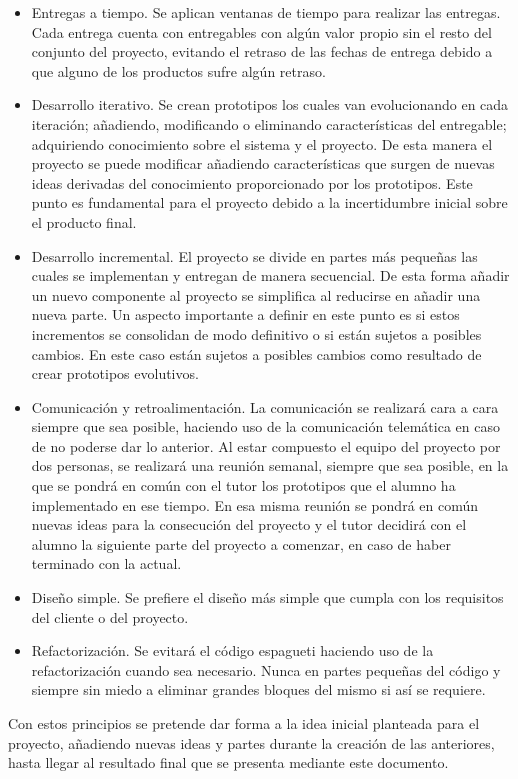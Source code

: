 \begin{itemize}
	\item Entregas a tiempo. Se aplican ventanas de tiempo para realizar las entregas. Cada entrega cuenta con entregables con algún valor propio sin el resto del conjunto del proyecto, evitando el retraso de las fechas de entrega debido a que alguno de los productos sufre algún retraso.
	\item Desarrollo iterativo. Se crean prototipos los cuales van evolucionando en cada iteración; añadiendo, modificando o eliminando características del entregable; adquiriendo conocimiento sobre el sistema y el proyecto. De esta manera el proyecto se puede modificar añadiendo características que surgen de nuevas ideas derivadas del conocimiento proporcionado por los prototipos. Este punto es fundamental para el proyecto debido a la incertidumbre inicial sobre el producto final.
	\item Desarrollo incremental. El proyecto se divide en partes más pequeñas las cuales se implementan y entregan de manera secuencial. De esta forma añadir un nuevo componente al proyecto se simplifica al reducirse en añadir una nueva parte. Un aspecto importante a definir en este punto es si estos incrementos se consolidan de modo definitivo o si están sujetos a posibles cambios. En este caso están sujetos a posibles cambios como resultado de crear prototipos evolutivos.
	\item Comunicación y retroalimentación. La comunicación se realizará cara a cara siempre que sea posible, haciendo uso de la comunicación telemática en caso de no poderse dar lo anterior. Al estar compuesto el equipo del proyecto por dos personas, se realizará una reunión semanal, siempre que sea posible, en la que se pondrá en común con el tutor los prototipos que el alumno ha implementado en ese tiempo. En esa misma reunión se pondrá en común nuevas ideas para la consecución del proyecto y el tutor decidirá con el alumno la siguiente parte del proyecto a comenzar, en caso de haber terminado con la actual.
	\item Diseño simple. Se prefiere el diseño más simple que cumpla con los requisitos del cliente o del proyecto.
	\item Refactorización. Se evitará el código espagueti haciendo uso de la refactorización cuando sea necesario. Nunca en partes pequeñas del código y siempre sin miedo a eliminar grandes bloques del mismo si así se requiere.
\end{itemize}

Con estos principios se pretende dar forma a la idea inicial planteada para el proyecto, añadiendo nuevas ideas y partes durante la creación de las anteriores, hasta llegar al resultado final que se presenta mediante este documento.

